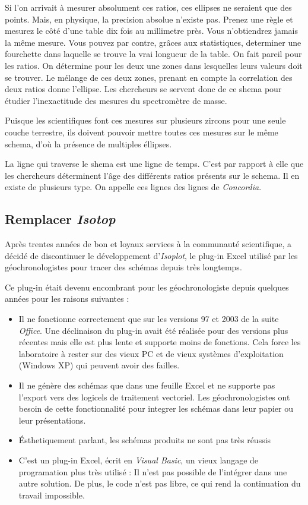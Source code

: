 Si l'on arrivait à mesurer absolument ces ratios, ces ellipses ne seraient que des points. Mais, en physique, la precision absolue n'existe pas. Prenez une règle et mesurez le côté d'une table dix fois au millimetre près. Vous n'obtiendrez jamais la même mesure. Vous pouvez par contre, grâces aux statistiques, determiner une fourchette dans laquelle se trouve la vrai longueur de la table. On fait pareil pour les ratios. On détermine pour les deux une zones dans lesquelles leurs valeurs doit se trouver. Le mélange de ces deux zones, prenant en compte la correlation des deux ratios donne l'ellipse. Les chercheurs se servent donc de ce shema pour étudier l'inexactitude des mesures du spectromètre de masse.

Puisque les scientifiques font ces mesures sur plusieurs zircons pour une seule couche terrestre, ils doivent pouvoir mettre toutes ces mesures sur le même schema, d'où la présence de multiples éllipses.

La ligne qui traverse le shema est une ligne de temps. C'est par rapport à elle que les chercheurs déterminent l'âge des différents ratios présents sur le schema. Il en existe de plusieurs type. On appelle ces lignes des lignes de \textit{Concordia}.

\subsection{Remplacer \textit{Isotop}}
Après trentes années de bon et loyaux services à la communauté scientifique, %
a décidé de discontinuer le développement d'\textit{Isoplot}, le plug-in Excel utilisé par les géochronologistes pour tracer des schémas depuis très longtemps.

Ce plug-in était devenu encombrant pour les géochronologiste depuis quelques années pour les raisons suivantes :
\begin{itemize}
\item Il ne fonctionne correctement que sur les versions 97 et 2003 de la suite \textit{Office}. Une déclinaison du plug-in avait été réalisée pour des versions plus récentes mais elle est plus lente et supporte moins de fonctions. Cela force les laboratoire à rester sur des vieux PC et de vieux systèmes d'exploitation (Windows XP) qui peuvent avoir des failles.
\item Il ne génère des schémas que dans une feuille Excel et ne supporte pas l'export vers des logicels de traitement vectoriel. Les géochronologistes ont besoin de cette fonctionnalité pour integrer les schémas dans leur papier ou leur présentations.
\item Ésthetiquement parlant, les schémas produits ne sont pas très réussis
\item C'est un plug-in Excel, écrit en \textit{Visual Basic}, un vieux langage de programation plus très utilisé : Il n'est pas possible de l'intégrer dans une autre solution. De plus, le code n'est pas libre, ce qui rend la continuation du travail impossible.
\end{itemize}

